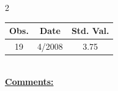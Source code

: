 
\bigskip 
\begin{multicols}{2}{ 
\begin{tabular}{ccc}
\hline  Obs.  &  Date &  Std. Val. \\ 
\hline 
                       19 &        4/2008 &          3.75 \vspace{-.12in} \\  
 \end{tabular} 
\\ 
 \columnbreak 
 \singlespacing 
 \underline{\textbf{Comments:}} \\ 
 \bigskip       

 } 
\end{multicols} 
